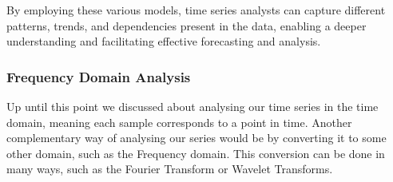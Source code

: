 \documentclass[../main.tex]{subfiles}
\begin{document}
        By employing these various models, time series analysts can capture different patterns, trends, and dependencies present in the data, enabling a deeper understanding and facilitating effective forecasting and analysis.
    
    \subsubsection{Frequency Domain Analysis}
        Up until this point we discussed about analysing our time series in the time domain, meaning each sample corresponds to a point in time. Another complementary way of analysing our series would be by converting it to some other domain, such as the Frequency domain. This conversion can be done in many ways, such as the Fourier Transform or Wavelet Transforms.   
\end{document}
